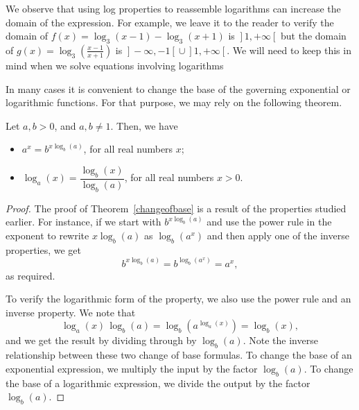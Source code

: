 We observe that using log properties to reassemble logarithms can increase the domain of the expression.  For example, we leave it to the reader to verify the domain of $f(x) = \log_{3}(x-1) - \log_{3}(x+1)$ is $\left.\right]1,+\infty\left[\right.$ but the domain of $g(x) = \log_{3}\left(\frac{x-1}{x+1}\right)$ is $\left.\right]-\infty, -1\left[\right. \cup \left.\right]1, +\infty\left[\right.$.  We will need to keep this in mind when we solve equations involving logarithms 

In many cases it is convenient to change the base of the governing exponential or logarithmic functions. For that purpose, we may rely on the following theorem. 

\begin{theorem} \label{changeofbase}  
Let $a,b >0$, and $a,b \neq 1$. Then, we have   

\begin{itemize}

\item  $a^{x} = b^{x \log_{b}(a)}$, for all real numbers $x$;

\item  $\log_{a}(x) = \dfrac{\log_{b}(x)}{\log_{b}(a)}$, for all real numbers $x > 0$.

\end{itemize}

\end{theorem}

\ifanalysis

\begin{proof}
The proof of Theorem~\ref{changeofbase} is a result of the properties studied earlier.  For instance, if we start with $b^{x \log_{b}(a)}$ and use the power rule in the exponent to rewrite $x \log_{b}(a)$ as $\log_{b}\left(a^{x}\right)$ and then apply one of the inverse properties, we get \[ b^{x \log_{b}(a)} = b^{\log_{b}\left(a^{x}\right)} = a^{x},\] as required. 

To verify the logarithmic form of the property, we also use the power rule and an inverse property. We note that \[\log_{a}(x) \, \log_{b}(a) =  \log_{b} \left(a^{\log_{a}(x)}\right) = \log_{b}(x),\] and we get the result by dividing through by $\log_{b}(a)$.  Note the inverse relationship between these two change of base formulas.  To change the base of an exponential expression, we multiply the input by the factor $\log_{b}(a)$.  To change the base of a logarithmic expression, we divide the output by the factor $\log_{b}(a)$.  
\end{proof}

